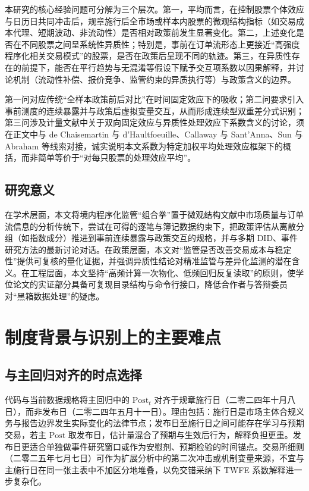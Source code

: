 \documentclass[UTF8, a4paper, 12pt]{ctexart}
\begin{document}
本研究的核心经验问题可分解为三个层次。第一，平均而言，在控制股票个体效应与日历日共同冲击后，规章施行后全市场或样本内股票的微观结构指标（如交易成本代理、短期波动、非流动性）是否相对政策前发生显著变化。第二，上述变化是否在不同股票之间呈系统性异质性；特别是，事前在订单流形态上更接近“高强度程序化相关交易模式”的股票，是否在政策后呈现不同的轨迹。第三，在异质性存在的前提下，能否在平行趋势与无混淆等假设下赋予交互项系数以因果解释，并讨论机制（流动性补偿、报价竞争、监管约束的异质执行等）与政策含义的边界。

第一问对应传统“全样本政策前后对比”在时间固定效应下的吸收；第二问要求引入事前测度的连续暴露并与政策后虚拟变量交互，从而形成连续型双重差分式识别；第三问涉及计量文献中关于双向固定效应与异质性处理效应下系数含义的讨论，须在正文中与 de Chaisemartin 与 d'Haultfoeuille、Callaway 与 Sant'Anna、Sun 与 Abraham 等线索对接，诚实说明本文系数为特定加权平均处理效应框架下的概括，而非简单等价于“对每只股票的处理效应平均”。

\subsection{研究意义}

在学术层面，本文将境内程序化监管“组合拳”置于微观结构文献中市场质量与订单流信息的分析传统下，尝试在可得的逐笔与簿记数据约束下，把政策评估从离散分组（如指数成分）推进到事前连续暴露与政策交互的规格，并与多期 DID、事件研究方法的最新讨论对话。在政策层面，本文对“监管是否改善交易成本与稳定性”提供可复核的量化证据，并强调异质性结论对精准监管与差异化监测的潜在含义。在工程层面，本文坚持“高频计算一次物化、低频回归反复读取”的原则，使学位论文的实证部分具备可复现目录结构与命令行接口，降低合作者与答辩委员对“黑箱数据处理”的疑虑。

\section{制度背景与识别上的主要难点}

\subsection{与主回归对齐的时点选择}

代码与当前数据规格将主回归中的 \(\mathrm{Post}_t\) 对齐于规章施行日（二零二四年十月八日），而非发布日（二零二四年五月十一日）。理由包括：施行日是市场主体合规义务与报告边界发生实际变化的法律节点；发布日至施行日之间可能存在学习与预期交易，若主 \(\mathrm{Post}\) 取发布日，估计量混合了预期与生效后行为，解释负担更重。发布日更适合单独做事件研究窗口或作为安慰剂、预期检验的时间锚点。交易所细则（二零二五年七月七日）可作为扩展分析中的第二次冲击或机制变量来源，不宜与主施行日在同一张主表中不加区分地堆叠，以免交错采纳下 TWFE 系数解释进一步复杂化。
\end{document}
